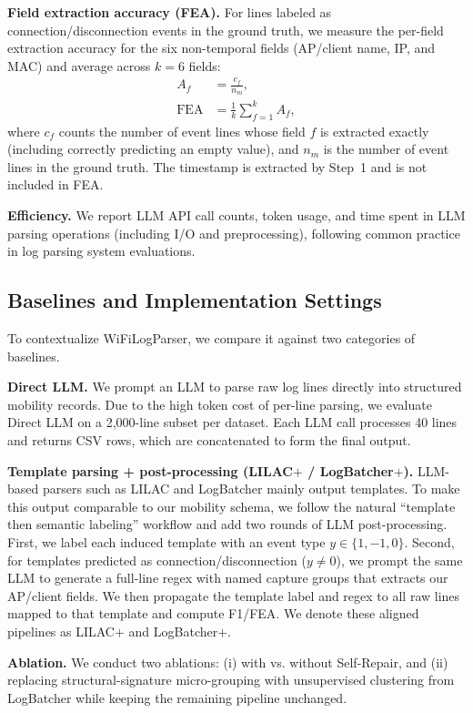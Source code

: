 \documentclass[journal]{IEEEtran}
\begin{document}
\textbf{Field extraction accuracy (FEA).} For lines labeled as connection/disconnection events in the ground truth, we measure the per-field extraction accuracy for the six non-temporal fields (AP/client name, IP, and MAC) and average across $k=6$ fields:
\begin{align}
	A_f        & = \frac{c_f}{n_m}, \nonumber     \\
	\text{FEA} & = \frac{1}{k}\sum_{f=1}^{k} A_f,
\end{align}
where $c_f$ counts the number of event lines whose field $f$ is extracted exactly (including correctly predicting an empty value), and $n_m$ is the number of event lines in the ground truth. The timestamp is extracted by Step~1 and is not included in FEA.

\textbf{Efficiency.} We report LLM API call counts, token usage, and time spent in LLM parsing operations (including I/O and preprocessing), following common practice in log parsing system evaluations.

\subsection{Baselines and Implementation Settings}
To contextualize WiFiLogParser, we compare it against two categories of baselines.

\textbf{Direct LLM.} We prompt an LLM to parse raw log lines directly into structured mobility records. Due to the high token cost of per-line parsing, we evaluate Direct LLM on a 2,000-line subset per dataset. Each LLM call processes 40 lines and returns CSV rows, which are concatenated to form the final output.

\textbf{Template parsing + post-processing (LILAC$+$ / LogBatcher$+$).} LLM-based parsers such as LILAC \cite{ref30} and LogBatcher \cite{ref32} mainly output templates. To make this output comparable to our mobility schema, we follow the natural ``template then semantic labeling'' workflow and add two rounds of LLM post-processing. First, we label each induced template with an event type $y\in\{1,-1,0\}$. Second, for templates predicted as connection/disconnection ($y\neq 0$), we prompt the same LLM to generate a full-line regex with named capture groups that extracts our AP/client fields. We then propagate the template label and regex to all raw lines mapped to that template and compute F1/FEA. We denote these aligned pipelines as LILAC$+$ and LogBatcher$+$.

\textbf{Ablation.} We conduct two ablations: (i) with vs. without Self-Repair, and (ii) replacing structural-signature micro-grouping with unsupervised clustering from LogBatcher while keeping the remaining pipeline unchanged.
\end{document}
